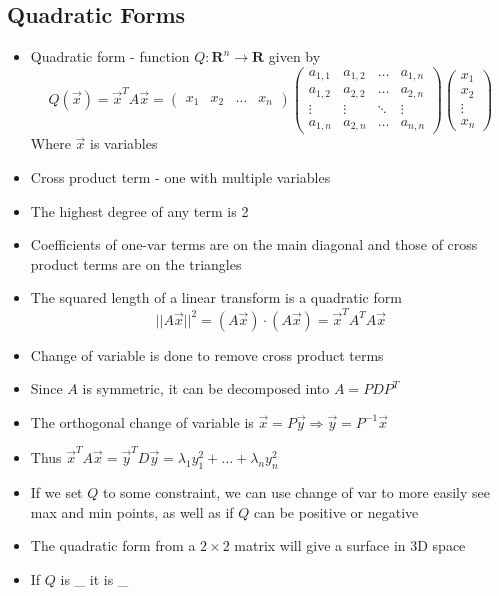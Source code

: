 \documentclass{article}
\begin{document}
\subsection{Quadratic Forms}
\begin{itemize}
    \item Quadratic form - function \(Q:\textbf{R}^n\rightarrow\textbf{R}\) given by
    \[Q(\vec{x})=\vec{x}^TA\vec{x}=
    \begin{pmatrix} x_1&x_2&\dots&x_n \end{pmatrix} 
    \begin{pmatrix} a_{1,1}&a_{1,2}&\dots&a_{1,n} \\ a_{1,2}&a_{2,2}&\dots&a_{2,n} 
        \\ \vdots&\vdots&\ddots&\vdots \\ a_{1,n}&a_{2,n}&\dots&a_{n,n}\end{pmatrix}
    \begin{pmatrix} x_1\\x_2\\\vdots\\x_n \end{pmatrix}\] Where \(\vec{x}\) is variables 
    \item Cross product term - one with multiple variables 
    \item The highest degree of any term is 2
    \item Coefficients of one-var terms are on the main diagonal and those of cross product terms are on the triangles 
    \item The squared length of a linear transform is a quadratic form \[||A\vec{x}||^2=(A\vec{x})\cdot(A\vec{x})=\vec{x}^TA^TA\vec{x}\]
    \item Change of variable is done to remove cross product terms 
    \item Since \(A\) is symmetric, it can be decomposed into \(A=PDP^T\)
    \item The orthogonal change of variable is \(\vec{x}=P\vec{y}\Rightarrow \vec{y}=P^{-1}\vec{x}\)
    \item Thus \(\vec{x}^TA\vec{x}=\vec{y}^TD\vec{y}=\lambda_1y_1^2+\dots+\lambda_ny_n^2\)
    \item If we set \(Q\) to some constraint, we can use change of var to more easily see max and min points, as well as if \(Q\) can be positive or negative 
    \item The quadratic form from a \(2\times 2\) matrix will give a surface in 3D space
    \item If \(Q\) is \_ it is \_ 

\end{itemize}
\end{document}
